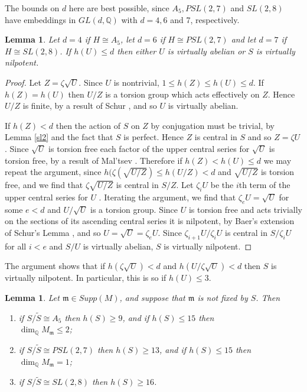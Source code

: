 \documentclass[12pt]{amsart}
\renewcommand{\geq}{\geqslant}
\renewcommand{\leq}{\leqslant}
\newtheorem{lemma}[theorem]{Lemma}
\begin{document}
The bounds on $d$ here are best possible,
since $A_5, PSL(2,7)$ and $SL(2,8)$ have embeddings in $GL(d,\mathbb{Q})$ with $d=4,6$ and 7, 
respectively.

\begin{lemma}
\label{gl(10,Q)}
Let $d=4$ if $H\cong{A_5}$, 
let $d=6$ if $H\cong{PSL(2,7)}$ and let $d=7$ if $H\cong{SL(2,8)}$.
If $h(U)\leq{d}$ then either $U$ is virtually abelian or $S$ is virtually nilpotent.
\end{lemma}

\begin{proof}
Let $Z=\zeta\sqrt{U}$.
Since $U$ is nontrivial,
$1\leq{h(Z)}\leq{h(U)}\leq{d}$.
If $h(Z)=h(U)$ then $U/Z$ is a torsion group which 
acts effectively on $Z$.
Hence $U/Z$ is finite, 
by a result of Schur \cite[8.1.11]{Ro},
and so $U$ is virtually abelian.

If $h(Z)<d$ then the action of $S$ on $Z$ by conjugation 
must be trivial,  by Lemma \ref{sl2} and the fact that $S$ is perfect.
Hence $Z$ is central in $S$ and so $Z=\zeta{U}$.
Since $\sqrt{U}$ is torsion free each factor of the upper central series
for $\sqrt{U}$ is torsion free, 
by a result of Mal'tsev \cite[5.2.19]{Ro}.
Therefore if $h(Z)<h(U)\leq{d}$ we may repeat the argument,
since $h(\zeta(\sqrt{U/Z})\leq{h(U/Z)}<d$ and 
$\sqrt{U/Z}$ is torsion free,
and we find that $\zeta\sqrt{U/Z}$ is central in $S/Z$.
Let $\zeta_i{U}$ be the $i$th term of the upper central series for $U$
\cite[page 121]{Ro}.
Iterating the argument, we find that $\zeta_eU=\sqrt{U}$ for some $e<d$ 
and $U/\sqrt{U}$ is a torsion group. 
Since $U$ is torsion free and acts trivially on the sections of its ascending
central series it is nilpotent,
by Baer's extension of Schur's Lemma \cite[14.5.1]{Ro},
and so $U=\sqrt{U}=\zeta_eU$.
Since $\zeta_{i+1}U/\zeta_iU$ is central in $S/\zeta_iU$ for all $i<e$
and $S/U$ is virtually abelian,  $S$ is virtually nilpotent.
\end{proof}

The argument shows that if $h(\zeta\sqrt{U})<d$ and $h(U/\zeta\sqrt{U})<d$ 
then $S$ is virtually nilpotent.
In particular,  this is so if $h(U)\leq3$.

\begin{lemma}
\label{mnotfixed}
Let $\mathfrak{m}\in{Supp(M)}$, and suppose that $\mathfrak{m}$ is not fixed by $S$.
Then 
\begin{enumerate}
\item{}if $S/\widetilde{S}\cong{A_5}$ then $h(S)\geq9$,
and if $h(S)\leq15$ then\\ $\dim_\mathbb{Q}M_\mathfrak{m}\leq2$;
\item{}if $S/\widetilde{S}\cong{PSL(2,7)}$ then $h(S)\geq13$,
and if $h(S)\leq15$ then\\ $\dim_\mathbb{Q}M_\mathfrak{m}=1$;
\item{}if $S/\widetilde{S}\cong{SL(2,8)}$ then $h(S)\geq16$.
\end{enumerate}
\end{lemma}
\end{document}
